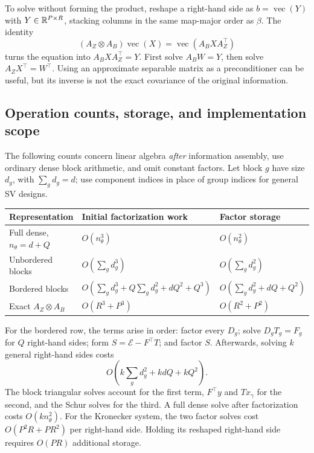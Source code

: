 To solve without forming the product, reshape a right-hand side as
$b=\operatorname{vec}(Y)$ with $Y\in\mathbb R^{P\times R}$, stacking
columns in the same map-major order as $\beta$.  The identity
\[
 (A_Z\otimes A_B)\operatorname{vec}(X)
       =\operatorname{vec}(A_BXA_Z^\top)
\]
turns the equation into $A_BXA_Z^\top=Y$.  First solve
$A_BW=Y$, then solve $A_ZX^\top=W^\top$.
Using an approximate separable matrix as a preconditioner can be useful,
but its inverse is not the exact covariance of the original information.

\subsection{Operation counts, storage, and implementation scope}
\label{cov-costs}

The following counts concern linear algebra \emph{after} information
assembly, use ordinary dense block arithmetic, and omit constant factors.
Let block $g$ have size $d_g$, with $\sum_gd_g=d$; use component
indices in place of group indices for general SV designs.

\begin{center}
\begin{tabularx}{\linewidth}{@{}lXX@{}}
\toprule
Representation & Initial factorization work & Factor storage\\
\midrule
Full dense, $n_\theta=d+Q$
 & $O(n_\theta^3)$
 & $O(n_\theta^2)$\\
Unbordered blocks
 & $O(\sum_gd_g^3)$
 & $O(\sum_gd_g^2)$\\
Bordered blocks
 & $O(\sum_gd_g^3+Q\sum_gd_g^2+dQ^2+Q^3)$
 & $O(\sum_gd_g^2+dQ+Q^2)$\\
Exact $A_Z\otimes A_B$
 & $O(R^3+P^3)$
 & $O(R^2+P^2)$\\
\bottomrule
\end{tabularx}
\end{center}

For the bordered row, the terms arise in order: factor every $D_g$;
solve $D_gT_g=F_g$ for $Q$ right-hand sides; form
$S=\mathcal E-F^\top T$; and factor $S$.
Afterwards, solving $k$ general right-hand sides costs
\[
 O\left(k\sum_gd_g^2+kdQ+kQ^2\right).
\]
The block triangular solves account for the first term,
$F^\top y$ and $Tx_\gamma$ for the second, and the Schur solves
for the third.  A full dense solve after factorization costs
$O(kn_\theta^2)$.  For the Kronecker system, the two factor solves
cost $O(P^2R+PR^2)$ per right-hand side.  Holding its reshaped
right-hand side requires $O(PR)$ additional storage.

